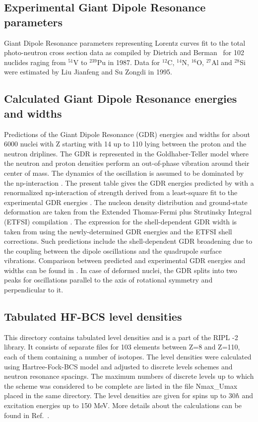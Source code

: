 \subsection{Experimental Giant Dipole Resonance parameters}

Giant Dipole Resonance parameters representing Lorentz curves fit to the
total photo-neutron cross section data as compiled by Dietrich and Berman~%
\cite{die88} for 102 nuclides raging from $^{51}$V to $^{239}$Pu in 1987.
Data for $^{12}$C, $^{14}$N, $^{16}$O, $^{27}$Al and $^{28}$Si were
estimated by Liu Jianfeng and Su Zongdi in 1995.

\subsection{Calculated Giant Dipole Resonance energies and widths}

Predictions of the Giant Dipole Resonance (GDR) energies and widths for
about 6000 nuclei with Z starting with 14 up to 110 lying between the proton
and the neutron driplines. The GDR is represented in the Goldhaber-Teller
model \cite{Goldhaber48} where the neutron and proton densities perform an
out-of-phase vibration around their center of mass. The dynamics of the
oscillation is assumed to be dominated by the np-interaction \cite{Isacker92}%
. The present table gives the GDR energies predicted by \cite{Isacker92}
with a renormalized np-interaction of strength derived from a least-square
fit to the experimental GDR energies \cite{Goriely98}. The nucleon density
distribution and ground-state deformation are taken from the Extended
Thomas-Fermi plus Strutinsky Integral (ETFSI) compilation \cite%
{Goriely2000,Aboussir95}. The expression for the shell-dependent GDR width
is taken from \cite{Thielemann1983} using the newly-determined GDR energies
and the ETFSI shell corrections. Such predictions include the
shell-dependent GDR broadening due to the coupling between the dipole
oscillations and the quadrupole surface vibrations. Comparison between
predicted and experimental GDR energies and widths can be found in \cite%
{Goriely98}. In case of deformed nuclei, the GDR splits into two peaks for
oscillations parallel to the axis of rotational symmetry and perpendicular
to it.

\subsection{Tabulated HF-BCS level densities}

This directory contains tabulated level densities%
 and is a part of the RIPL%
-2 library. It consists of separate files for 103 elements
between Z=8 and Z=110, each of them containing a number of isotopes. The
level densities were calculated using Hartree-Fock-BCS model and adjusted to
discrete levels schemes and neutron resonance spacings. The maximum numbers
of discrete levels up to which the scheme was considered to be complete are
listed in the file Nmax\_Umax placed in the same directory. The level
densities are given for spins up to 30$\hbar$ and excitation energies up to
150 MeV. More details about the calculations can be found in Ref.~\cite%
{HFBCS}.

